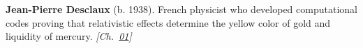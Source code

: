 \textbf{Jean-Pierre Desclaux} (b. 1938). French physicist who developed computational codes proving that relativistic effects determine the yellow color of gold and liquidity of mercury. \emph{[Ch.~\hyperref[ch:goldrelativity]{01}]}

